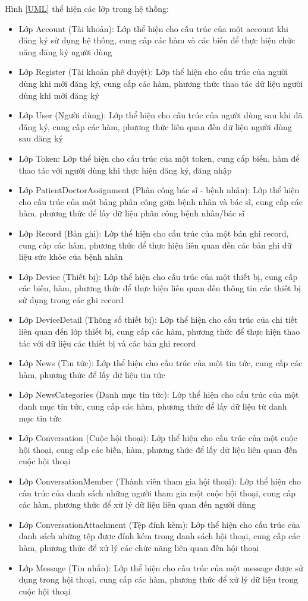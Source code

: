   Hình \ref*{UML} thể hiện các lớp trong hệ thống:
  \begin{itemize}
    \item Lớp Account (Tài khoản): Lớp thể hiện cho cấu trúc của một account khi đăng ký sử dụng hệ thống, cung cấp các hàm và các biến để thực hiện chức năng đăng ký người dùng
    \item Lớp Register (Tài khoản phê duyệt): Lớp thể hiện cho cấu trúc của người dùng khi mới đăng ký, cung cấp các hàm, phương thức thao tác dữ liệu người dùng khi mới đăng ký
    \item Lớp User (Người dùng): Lớp thể hiện cho cấu trúc của người dùng sau khi đã đăng ký, cung cấp các hàm, phương thức liên quan đến dữ liệu người dùng sau đăng ký
    \item Lớp Token: Lớp thể hiện cho cấu trúc của một token, cung cấp biến, hàm để thao tác với người dùng khi thực hiện đăng ký, đăng nhập
    \item Lớp PatientDoctorAssignment (Phân công bác sĩ - bệnh nhân): Lớp thể hiện cho cấu trúc của một bảng phân công giữa bệnh nhân và bác sĩ, cung cấp các hàm, phương thức để lấy dữ liệu phân công bệnh nhân/bác sĩ
    \item Lớp Record (Bản ghi): Lớp thể hiện cho cấu trúc của một bản ghi record, cung cấp các hàm, phương thức để thực hiện liên quan đến các bản ghi dữ liệu sức khỏe của bệnh nhân
    \item Lớp Device (Thiết bị): Lớp thể hiện cho cấu trúc của một thiết bị, cung cấp các biến, hàm, phương thức để thực hiện liên quan đến thông tin các thiết bị sử dụng trong các ghi record
    \item Lớp DeviceDetail (Thông số thiết bị): Lớp thể hiện cho cấu trúc của chi tiết liên quan đến lớp thiết bị, cung cấp các hàm, phương thức để thực hiện thao tác với dữ liệu các thiết bị và các bản ghi record
    \item Lớp News (Tin tức): Lớp thể hiện cho cấu trúc của một tin tức, cung cấp các hàm, phương thức để lấy dữ liệu tin tức
    \item Lớp NewsCategories (Danh mục tin tức): Lớp thể hiện cho cấu trúc của một danh mục tin tức, cung cấp các hàm, phương thức để lấy dữ liệu từ danh mục tin tức
    \item Lớp Conversation (Cuộc hội thoại): Lớp thể hiện cho cấu trúc của một cuộc hội thoại, cung cấp các biến, hàm, phương thức để lấy dữ liệu liên quan đến cuộc hội thoại
    \item Lớp ConversationMember (Thành viên tham gia hội thoại): Lớp thể hiện cho cấu trúc của danh sách những người tham gia một cuộc hội thoại, cung cấp các hàm, phương thức để xử lý dữ liệu liên quan đến người dùng
    \item Lớp ConversationAttachment (Tệp đính kèm): Lớp thể hiện cho cấu trúc của danh sách những tệp được đính kém trong danh sách hội thoại, cung cấp các hàm, phương thức để xử lý các chức năng liên quan đến hội thoại
    \item Lớp Message (Tin nhắn): Lớp thể hiện cho cấu trúc của một message được sử dụng trong hội thoại, cung cấp các hàm, phương thức để xử lý dữ liệu trong cuộc hội thoại
  \end{itemize}
